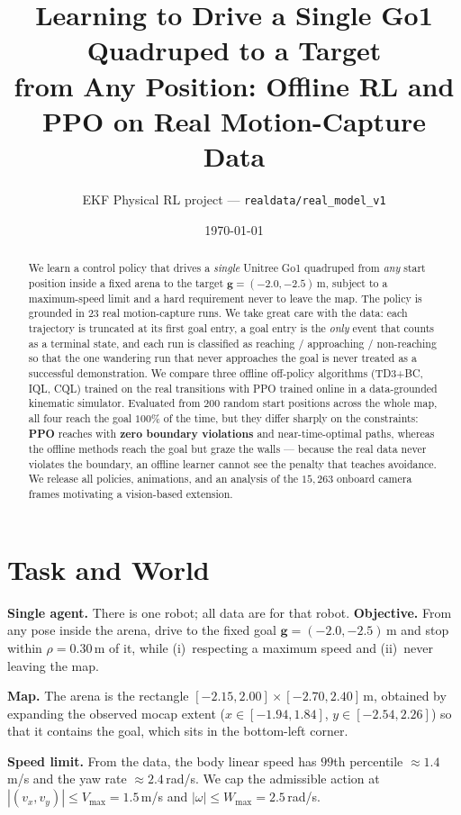 \documentclass[11pt]{article}
\title{\textbf{Learning to Drive a Single Go1 Quadruped to a Target\\
from Any Position: Offline RL and PPO on Real Motion-Capture Data}}
\author{EKF Physical RL project --- \texttt{realdata/real\_model\_v1}}
\date{\today}
\begin{document}
\maketitle

\begin{abstract}
We learn a control policy that drives a \emph{single} Unitree Go1 quadruped from
\emph{any} start position inside a fixed arena to the target
$\mathbf g=(-2.0,-2.5)\,$m, subject to a maximum-speed limit and a hard
requirement never to leave the map. The policy is grounded in $23$ real
motion-capture runs. We take great care with the data: each trajectory is
truncated at its first goal entry, a goal entry is the \emph{only} event that
counts as a terminal state, and each run is classified as reaching / approaching
/ non-reaching so that the one wandering run that never approaches the goal is
never treated as a successful demonstration. We compare three offline
off-policy algorithms (TD3+BC, IQL, CQL) trained on the real transitions with
PPO trained online in a data-grounded kinematic simulator. Evaluated from
$200$ random start positions across the whole map, all four reach the goal
$100\%$ of the time, but they differ sharply on the constraints: \textbf{PPO}
reaches with \textbf{zero boundary violations} and near-time-optimal paths,
whereas the offline methods reach the goal but graze the walls --- because the
real data never violates the boundary, an offline learner cannot see the
penalty that teaches avoidance. We release all policies, animations, and an
analysis of the $15{,}263$ onboard camera frames motivating a vision-based
extension.
\end{abstract}

\section{Task and World}
\textbf{Single agent.} There is one robot; all data are for that robot.
\textbf{Objective.} From any pose inside the arena, drive to the fixed goal
$\mathbf g=(-2.0,-2.5)\,$m and stop within $\rho=0.30\,$m of it, while
(i)~respecting a maximum speed and (ii)~never leaving the map.

\textbf{Map.} The arena is the rectangle
$[-2.15,2.00]\times[-2.70,2.40]\,$m, obtained by expanding the observed mocap
extent ($x\in[-1.94,1.84]$, $y\in[-2.54,2.26]$) so that it contains the goal,
which sits in the bottom-left corner.

\textbf{Speed limit.} From the data, the body linear speed has $99$th
percentile $\approx1.4\,$m/s and the yaw rate $\approx2.4\,$rad/s. We cap the
admissible action at $|(v_x,v_y)|\le V_{\max}=1.5\,$m/s and
$|\omega|\le W_{\max}=2.5\,$rad/s.
\end{document}
